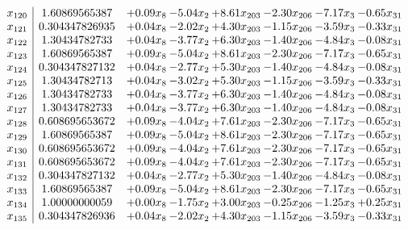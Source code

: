 \documentclass[8pt]{article}
\begin{document}
\[\begin{array}{c| c c@{\hskip 2pt} c@{\hskip 2pt} c@{\hskip 2pt} c@{\hskip 2pt} c@{\hskip 2pt} c@{\hskip 2pt} }
 x_{120}   &  1.60869565387 & +  0.09 x_{8} & -5.04 x_{2} & +  8.61 x_{203} & -2.30 x_{206} & -7.17 x_{3} & -0.65 x_{31}\\
 x_{121}   &  0.304347826935 & +  0.04 x_{8} & -2.02 x_{2} & +  4.30 x_{203} & -1.15 x_{206} & -3.59 x_{3} & -0.33 x_{31}\\
 x_{122}   &  1.30434782733 & +  0.04 x_{8} & -3.77 x_{2} & +  6.30 x_{203} & -1.40 x_{206} & -4.84 x_{3} & -0.08 x_{31}\\
 x_{123}   &  1.60869565387 & +  0.09 x_{8} & -5.04 x_{2} & +  8.61 x_{203} & -2.30 x_{206} & -7.17 x_{3} & -0.65 x_{31}\\
 x_{124}   &  0.304347827132 & +  0.04 x_{8} & -2.77 x_{2} & +  5.30 x_{203} & -1.40 x_{206} & -4.84 x_{3} & -0.08 x_{31}\\
 x_{125}   &  1.30434782713 & +  0.04 x_{8} & -3.02 x_{2} & +  5.30 x_{203} & -1.15 x_{206} & -3.59 x_{3} & -0.33 x_{31}\\
 x_{126}   &  1.30434782733 & +  0.04 x_{8} & -3.77 x_{2} & +  6.30 x_{203} & -1.40 x_{206} & -4.84 x_{3} & -0.08 x_{31}\\
 x_{127}   &  1.30434782733 & +  0.04 x_{8} & -3.77 x_{2} & +  6.30 x_{203} & -1.40 x_{206} & -4.84 x_{3} & -0.08 x_{31}\\
 x_{128}   &  0.608695653672 & +  0.09 x_{8} & -4.04 x_{2} & +  7.61 x_{203} & -2.30 x_{206} & -7.17 x_{3} & -0.65 x_{31}\\
 x_{129}   &  1.60869565387 & +  0.09 x_{8} & -5.04 x_{2} & +  8.61 x_{203} & -2.30 x_{206} & -7.17 x_{3} & -0.65 x_{31}\\
 x_{130}   &  0.608695653672 & +  0.09 x_{8} & -4.04 x_{2} & +  7.61 x_{203} & -2.30 x_{206} & -7.17 x_{3} & -0.65 x_{31}\\
 x_{131}   &  0.608695653672 & +  0.09 x_{8} & -4.04 x_{2} & +  7.61 x_{203} & -2.30 x_{206} & -7.17 x_{3} & -0.65 x_{31}\\
 x_{132}   &  0.304347827132 & +  0.04 x_{8} & -2.77 x_{2} & +  5.30 x_{203} & -1.40 x_{206} & -4.84 x_{3} & -0.08 x_{31}\\
 x_{133}   &  1.60869565387 & +  0.09 x_{8} & -5.04 x_{2} & +  8.61 x_{203} & -2.30 x_{206} & -7.17 x_{3} & -0.65 x_{31}\\
 x_{134}   &  1.00000000059 & +  0.00 x_{8} & -1.75 x_{2} & +  3.00 x_{203} & -0.25 x_{206} & -1.25 x_{3} & +  0.25 x_{31}\\
 x_{135}   &  0.304347826936 & +  0.04 x_{8} & -2.02 x_{2} & +  4.30 x_{203} & -1.15 x_{206} & -3.59 x_{3} & -0.33 x_{31}\\

\end{array}\]
\end{document}
